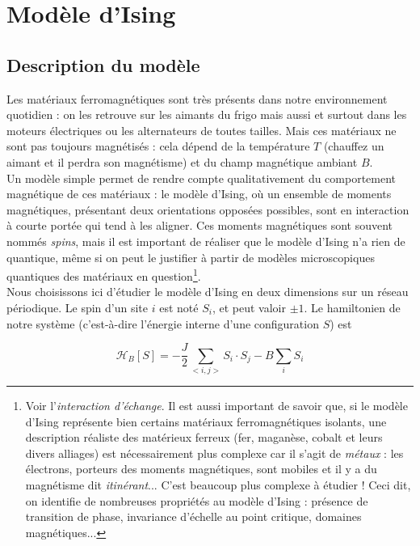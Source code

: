 \documentclass{book}
\begin{document}
\section{Modèle d'Ising}

\subsection{Description du modèle}

Les matériaux ferromagnétiques sont très présents dans notre environnement quotidien : on les retrouve sur les aimants du frigo mais aussi et surtout dans les moteurs électriques ou les alternateurs de toutes tailles. Mais ces matériaux ne sont pas toujours magnétisés : cela dépend de la température $T$ (chauffez un aimant et il perdra son magnétisme) et du champ magnétique ambiant $B$.\\

Un modèle simple permet de rendre compte qualitativement du comportement magnétique de ces matériaux : le modèle d'Ising, où un ensemble de moments magnétiques, présentant deux orientations opposées possibles, sont en interaction à courte portée qui tend à les aligner. Ces moments magnétiques sont souvent nommés \emph{spins}, mais il est important de réaliser que le modèle d'Ising n'a rien de quantique, même si on peut le justifier à partir de modèles microscopiques quantiques des matériaux en question\footnote{Voir l'\emph{interaction d'échange}. Il est aussi important de savoir que, si le modèle d'Ising représente bien certains matériaux ferromagnétiques isolants, une description réaliste des matérieux ferreux (fer, maganèse, cobalt et leurs divers alliages) est nécessairement plus complexe car il s'agit de \emph{métaux} : les électrons, porteurs des moments magnétiques, sont mobiles et il y a du magnétisme dit \emph{itinérant}... C'est beaucoup plus complexe à étudier ! Ceci dit, on identifie de nombreuses propriétés au modèle d'Ising : présence de transition de phase, invariance d'échelle au point critique, domaines magnétiques...}.\\

Nous choisissons ici d'étudier le modèle d'Ising en deux dimensions sur un réseau périodique. Le spin d'un site $i$ est noté $S_i$, et peut valoir $\pm 1$. Le hamiltonien de notre système (c'est-à-dire l'énergie interne d'une configuration $S$) est

\begin{equation}
\mathcal{H}_B[S] = -\frac{J}{2}\sum_{<i,j>}S_i\cdot S_j-B\sum_i S_i
\end{equation}
\end{document}
